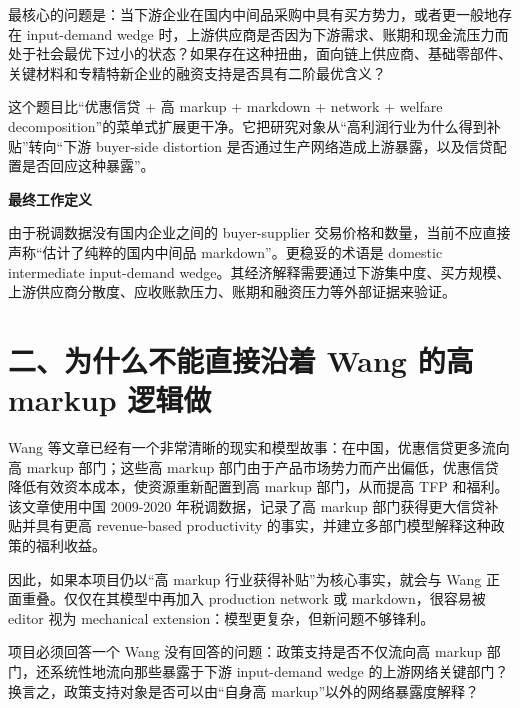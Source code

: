 \documentclass[
  12pt,
]{ctexart}
\begin{document}
最核心的问题是：当下游企业在国内中间品采购中具有买方势力，或者更一般地存在 input-demand wedge 时，上游供应商是否因为下游需求、账期和现金流压力而处于社会最优下过小的状态？如果存在这种扭曲，面向链上供应商、基础零部件、关键材料和专精特新企业的融资支持是否具有二阶最优含义？

这个题目比``优惠信贷 + 高 markup + markdown + network + welfare decomposition''的菜单式扩展更干净。它把研究对象从``高利润行业为什么得到补贴''转向``下游 buyer-side distortion 是否通过生产网络造成上游暴露，以及信贷配置是否回应这种暴露''。

\textbf{最终工作定义}

由于税调数据没有国内企业之间的 buyer-supplier 交易价格和数量，当前不应直接声称``估计了纯粹的国内中间品 markdown''。更稳妥的术语是 domestic intermediate input-demand wedge。其经济解释需要通过下游集中度、买方规模、上游供应商分散度、应收账款压力、账期和融资压力等外部证据来验证。

\section{二、为什么不能直接沿着 Wang 的高 markup 逻辑做}\label{ux4e8cux4e3aux4ec0ux4e48ux4e0dux80fdux76f4ux63a5ux6cbfux7740-wang-ux7684ux9ad8-markup-ux903bux8f91ux505a}

Wang 等文章已经有一个非常清晰的现实和模型故事：在中国，优惠信贷更多流向高 markup 部门；这些高 markup 部门由于产品市场势力而产出偏低，优惠信贷降低有效资本成本，使资源重新配置到高 markup 部门，从而提高 TFP 和福利。该文章使用中国 2009-2020 年税调数据，记录了高 markup 部门获得更大信贷补贴并具有更高 revenue-based productivity 的事实，并建立多部门模型解释这种政策的福利收益。

因此，如果本项目仍以``高 markup 行业获得补贴''为核心事实，就会与 Wang 正面重叠。仅仅在其模型中再加入 production network 或 markdown，很容易被 editor 视为 mechanical extension：模型更复杂，但新问题不够锋利。

项目必须回答一个 Wang 没有回答的问题：政策支持是否不仅流向高 markup 部门，还系统性地流向那些暴露于下游 input-demand wedge 的上游网络关键部门？换言之，政策支持对象是否可以由``自身高 markup''以外的网络暴露度解释？
\end{document}
